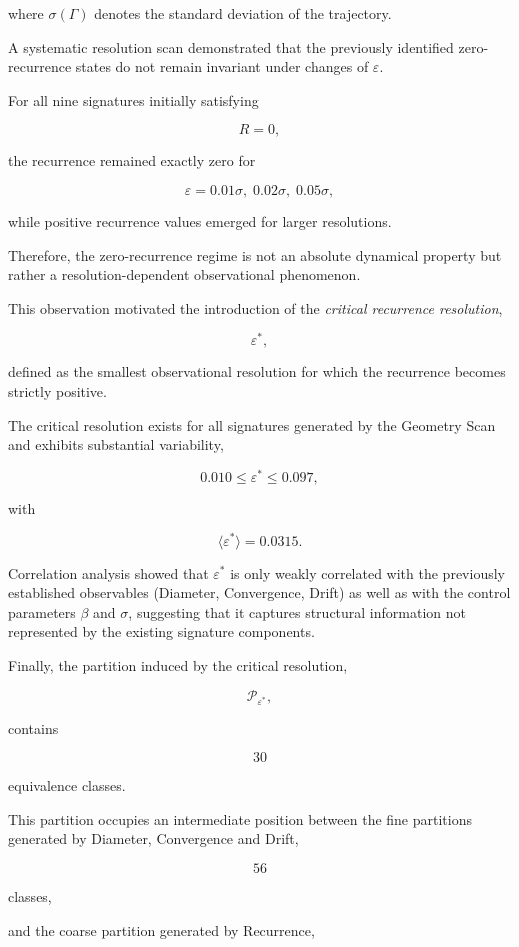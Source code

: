 where $\sigma(\Gamma)$ denotes the standard deviation of the trajectory.

A systematic resolution scan demonstrated that the previously identified zero-recurrence states do not remain invariant under changes of $\varepsilon$.

For all nine signatures initially satisfying

\[
R=0,
\]

the recurrence remained exactly zero for

\[
\varepsilon
=
0.01\sigma,
\;
0.02\sigma,
\;
0.05\sigma,
\]

while positive recurrence values emerged for larger resolutions.

Therefore, the zero-recurrence regime is not an absolute dynamical property but rather a resolution-dependent observational phenomenon.

This observation motivated the introduction of the \emph{critical recurrence resolution},

\[
\varepsilon^\ast,
\]

defined as the smallest observational resolution for which the recurrence becomes strictly positive.

The critical resolution exists for all signatures generated by the Geometry Scan and exhibits substantial variability,

\[
0.010
\le
\varepsilon^\ast
\le
0.097,
\]

with

\[
\langle
\varepsilon^\ast
\rangle
=
0.0315.
\]

Correlation analysis showed that $\varepsilon^\ast$ is only weakly correlated with the previously established observables (Diameter, Convergence, Drift) as well as with the control parameters $\beta$ and $\sigma$, suggesting that it captures structural information not represented by the existing signature components.

Finally, the partition induced by the critical resolution,

\[
\mathcal P_{\varepsilon^\ast},
\]

contains

\[
30
\]

equivalence classes.

This partition occupies an intermediate position between the fine partitions generated by Diameter, Convergence and Drift,

\[
56
\]

classes,

and the coarse partition generated by Recurrence,


